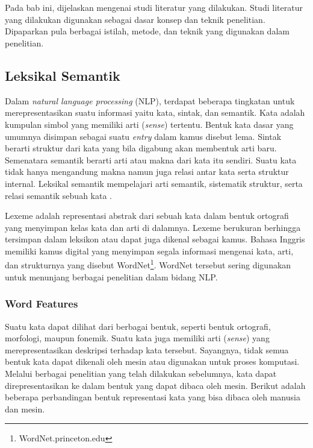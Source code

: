 \chapter{\babDua}
Pada bab ini, dijelaskan mengenai studi literatur yang dilakukan. Studi literatur yang dilakukan digunakan sebagai dasar konsep dan teknik penelitian. Dipaparkan pula berbagai istilah, metode, dan teknik yang digunakan dalam penelitian.

%
\section{Leksikal Semantik}
Dalam \textit{natural language processing} (NLP), terdapat beberapa tingkatan untuk merepresentasikan suatu informasi yaitu kata, sintak, dan semantik. Kata adalah kumpulan simbol yang memiliki arti (\textit{sense}) tertentu. Bentuk kata dasar yang umumnya disimpan sebagai suatu \textit{entry} dalam kamus disebut lema. Sintak berarti struktur dari kata yang bila digabung akan membentuk arti baru. Semenatara semantik berarti arti atau makna dari kata itu sendiri. Suatu kata tidak hanya mengandung makna namun juga relasi antar kata serta struktur internal. Leksikal semantik mempelajari arti semantik, sistematik struktur, serta relasi semantik sebuah kata \citep{jurafsky2000speech}. %

Lexeme adalah representasi abstrak dari sebuah kata dalam bentuk ortografi yang menyimpan kelas kata dan arti di dalamnya. Lexeme berukuran berhingga tersimpan dalam leksikon atau dapat juga dikenal sebagai kamus. Bahasa Inggris memiliki kamus digital yang menyimpan segala informasi mengenai kata, arti, dan strukturnya yang disebut WordNet\footnote{WordNet.princeton.edu}. WordNet tersebut sering digunakan untuk menunjang berbagai penelitian dalam bidang NLP. 

\subsection{Word Features}
Suatu kata dapat dilihat dari berbagai bentuk, seperti bentuk ortografi, morfologi, maupun fonemik. Suatu kata juga memiliki arti (\textit{sense}) yang merepresentasikan deskripsi terhadap kata tersebut. Sayangnya, tidak semua bentuk kata dapat dikenali oleh mesin atau digunakan untuk proses komputasi. Melalui berbagai penelitian yang telah dilakukan sebelumnya, kata dapat direpresentasikan ke dalam bentuk yang dapat dibaca oleh mesin. Berikut adalah beberapa perbandingan bentuk representasi kata yang bisa dibaca oleh manusia dan mesin.

